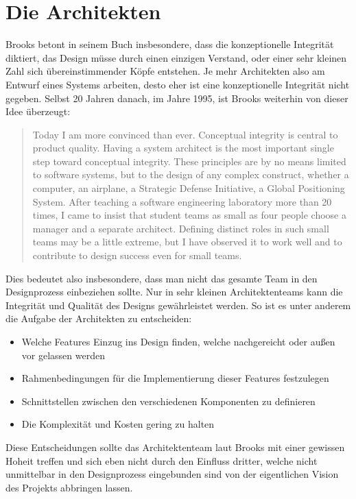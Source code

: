 \documentclass[a4paper, ngerman, 12pt, usenames, dvipsnames]{article}
\begin{document}
\section{Die Architekten}
Brooks betont in seinem Buch insbesondere, dass die konzeptionelle Integrität diktiert, das Design müsse durch einen einzigen Verstand, oder einer sehr kleinen Zahl sich übereinstimmender Köpfe entstehen. Je mehr Architekten also am Entwurf eines Systems arbeiten, desto eher ist eine konzeptionelle Integrität nicht gegeben.
Selbst 20 Jahren danach, im Jahre 1995, ist Brooks weiterhin von dieser Idee überzeugt: 
\begin{quote}
    Today I am more convinced than ever. Conceptual integrity is central to product quality. Having a system architect is the most important single step toward conceptual integrity. These principles are by no means limited to software systems, but to the design of any complex construct, whether a computer, an airplane, a Strategic Defense Initiative, a Global Positioning System. After teaching a software engineering laboratory more than 20 times, I came to insist that student teams as small as four people choose a manager and a separate architect. Defining distinct roles in such small teams may be a little extreme, but I have observed it to work well and to contribute to design success even for small teams. \cite{wikic2:conceptual_integrity}
\end{quote}
Dies bedeutet also insbesondere, dass man nicht das gesamte Team in den Designprozess einbeziehen sollte. Nur in sehr kleinen Architektenteams kann die Integrität und Qualität des Designs gewährleistet werden.
\pagebreak
So ist es unter anderem die Aufgabe der Architekten zu entscheiden:
\begin{itemize}
    \item Welche Features Einzug ins Design finden, welche nachgereicht oder außen vor gelassen werden
    \item Rahmenbedingungen für die Implementierung dieser Features festzulegen
    \item Schnittstellen zwischen den verschiedenen Komponenten zu definieren
    \item Die Komplexität und Kosten gering zu halten
\end{itemize}
Diese Entscheidungen sollte das Architektenteam laut Brooks mit einer gewissen Hoheit treffen und sich eben nicht durch den Einfluss dritter, welche nicht unmittelbar in den Designprozess eingebunden sind von der eigentlichen Vision des Projekts abbringen lassen. 
\end{document}
